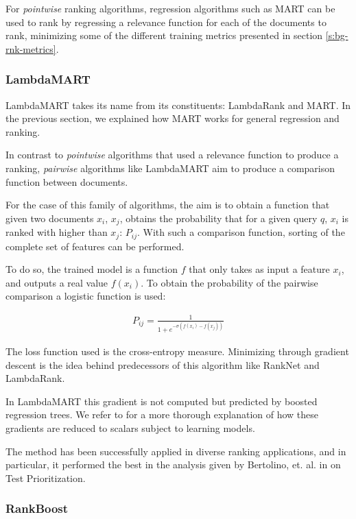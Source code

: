 For \emph{pointwise} ranking algorithms, regression algorithms such as MART can be used to rank
by regressing a relevance function for each of the documents to rank, minimizing some of the 
different training metrics presented in section \ref{s:bg-rnk-metrics}.

\subsubsection{LambdaMART}
LambdaMART takes its name from its constituents: LambdaRank and MART. In the previous section, we 
explained how MART works for general regression and ranking.

In contrast to \emph{pointwise} algorithms that used a relevance function to produce a ranking, 
\emph{pairwise} algorithms like LambdaMART aim to produce a comparison function between documents.

For the case of this family of algorithms, the aim is to obtain a function that given two documents $x_i$, $x_j$, 
obtains the probability that for a given query $q$, $x_i$ is ranked with higher than $x_j$: $P_{ij}$. With 
such a comparison function, sorting of the complete set of features can be performed.

To do so, the trained model is a function $f$ that only takes as input a feature $x_i$, 
and outputs a real value $f(x_i)$. To obtain the probability of the pairwise comparison a logistic function is used:

\begin{align*}
P_{ij} = \frac{1}{1+e^{-\sigma(f(x_i)-f(x_j))}}
\end{align*}

The loss function used is the cross-entropy measure. Minimizing through gradient descent is the idea behind predecessors
of this algorithm like RankNet and LambdaRank.

In LambdaMART this gradient is not computed but predicted by boosted regression trees. We refer
to \cite{lambdamart} for a more thorough explanation of how these gradients are reduced to scalars
subject to learning models.

The method has been successfully applied in diverse ranking applications, and in particular, it performed
the best in the analysis given by Bertolino, et. al. in \cite{Bertolino2020LearningtoRankVR} on Test Prioritization.

\subsubsection{RankBoost}\label{s:bg-tsp-rankboost}

